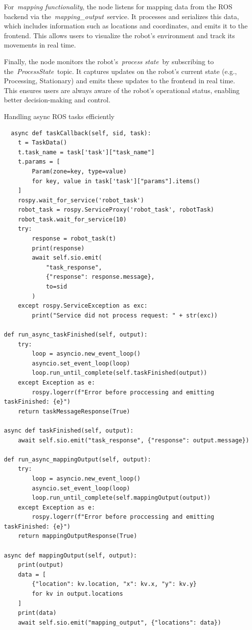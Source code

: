 \documentclass[../../main]{subfiles}
\begin{document}
For~\emph{mapping functionality}, the node listens for mapping data from
the ROS backend via the~\emph{mapping\_output}~service. It processes and
serializes this data, which includes information such as locations and
coordinates, and emits it to the frontend. This allows users to
visualize the robot's environment and track its movements in real time.

Finally, the node monitors the robot's~\emph{process state}~by
subscribing to the~\emph{ProcessState}~topic. It captures updates on the
robot's current state (e.g., Processing, Stationary) and emits these
updates to the frontend in real time. This ensures users are always
aware of the robot's operational status, enabling better decision-making
and control.

\begin{codebox}[]{Handling async ROS tasks efficiently}
  \begin{verbatim}
  async def taskCallback(self, sid, task):
    t = TaskData()
    t.task_name = task['task']["task_name"]
    t.params = [
        Param(zone=key, type=value) 
        for key, value in task['task']["params"].items()
    ]
    rospy.wait_for_service('robot_task')
    robot_task = rospy.ServiceProxy('robot_task', robotTask)
    robot_task.wait_for_service(10)
    try:
        response = robot_task(t)
        print(response)
        await self.sio.emit(
            "task_response", 
            {"response": response.message}, 
            to=sid
        )
    except rospy.ServiceException as exc:
        print("Service did not process request: " + str(exc))

def run_async_taskFinished(self, output):
    try:
        loop = asyncio.new_event_loop()
        asyncio.set_event_loop(loop)
        loop.run_until_complete(self.taskFinished(output))
    except Exception as e:
        rospy.logerr(f"Error before proccessing and emitting taskFinished: {e}")
    return taskMessageResponse(True)

async def taskFinished(self, output):
    await self.sio.emit("task_response", {"response": output.message})

def run_async_mappingOutput(self, output):
    try:
        loop = asyncio.new_event_loop()
        asyncio.set_event_loop(loop)
        loop.run_until_complete(self.mappingOutput(output))
    except Exception as e:
        rospy.logerr(f"Error before proccessing and emitting taskFinished: {e}")
    return mappingOutputResponse(True)

async def mappingOutput(self, output):
    print(output)
    data = [
        {"location": kv.location, "x": kv.x, "y": kv.y} 
        for kv in output.locations
    ]
    print(data)
    await self.sio.emit("mapping_output", {"locations": data})
\end{verbatim}
\end{codebox}
\end{document}
